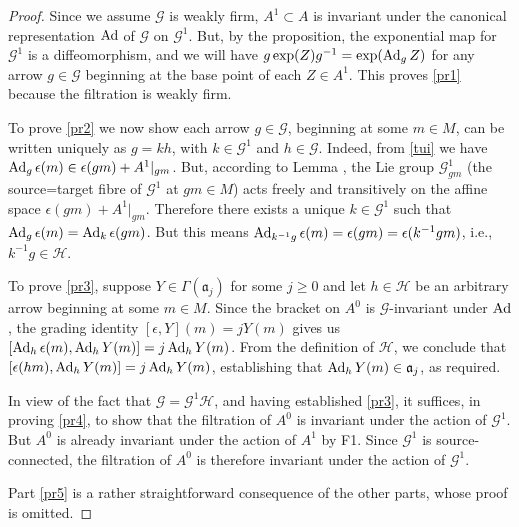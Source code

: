 \documentclass[leqno,12pt]{amsart} %
\begin{document}
\begin{proof}
  Since we assume ${\mathcal G} $ is weakly firm, ${A^1 \subset A}$ is invariant under the
  canonical representation $\operatorname{Ad}$ of ${\mathcal G} $ on ${\mathcal G}^1$. But, by the
  proposition, the exponential map for ${\mathcal G}^1$ is a diffeomorphism, and we will
  have $g\exp(Z)g^{-1} = \exp(\operatorname{Ad}_gZ)$ for any arrow $g \in {\mathcal G} $ beginning
  at the base point of each $Z \in A^1$. This proves \eqref{pr1} because the filtration is
  weakly firm.

  To prove \eqref{pr2} we now show each arrow $g \in {\mathcal G}$, beginning at some
  $m \in M$, can be written uniquely as $g = kh$, with $k \in {\mathcal G}^1$ and
  $h \in {\mathcal G} $. Indeed, from \eqref{tui} we have
  $\operatorname{Ad}_g\epsilon(m) \in \epsilon(gm) + A^1|_{gm}$. But, according to Lemma
  , the Lie group ${\mathcal G}^1_{gm}$ (the source=target
  fibre of ${\mathcal G}^1$ at $gm \in M$) acts freely and transitively on the affine
  space $\epsilon(gm) + A^1|_{gm}$. Therefore there exists a unique $k \in {\mathcal G}^1$ such
  that $\operatorname{Ad}_g\epsilon(m) = \operatorname{Ad}_k \epsilon(gm)$. But this means
  $\operatorname{Ad}_{k^{-1}g}\epsilon(m) = \epsilon(gm) = \epsilon(k^{-1}gm)$, i.e., $k^{-1}g \in {\mathcal H} $.

  To prove \eqref{pr3}, suppose $Y \in \Gamma({\mathfrak a}_j)$ for some $j\ge 0$ and let
  $h \in {\mathcal H} $ be an arbitrary arrow beginning at some $m \in M$. Since the
  bracket on $A^0$ is ${\mathcal G}$-invariant under $\operatorname{Ad}$, the grading identity
  $[\epsilon, Y](m) = jY(m)$ gives us $[\operatorname{Ad}_h\epsilon(m), \operatorname{Ad}_hY(m)] = j\operatorname{Ad}_hY(m)$. From
  the definition of ${\mathcal H} $, we conclude that
  $[\epsilon(hm), \operatorname{Ad}_hY(m)] = j\operatorname{Ad}_hY(m)$, establishing that
  $\operatorname{Ad}_hY(m) \in {\mathfrak a}_j$, as required.

  In view of the fact that ${\mathcal G} = {\mathcal G}^1 {\mathcal H} $, and having
  established \eqref{pr3}, it suffices, in proving \eqref{pr4}, to show that the
  filtration of $A^0$ is invariant under the action of ${\mathcal G}^1$. But $A^0$ is
  already invariant under the action of $A^1$ by F1. Since ${\mathcal G}^1$ is
  source-connected, the filtration of $A^0$ is therefore invariant under the action of
  ${\mathcal G}^1$.

  Part \eqref{pr5} is a rather straightforward consequence of the other parts, whose
  proof is omitted.
\end{proof}
\end{document}
